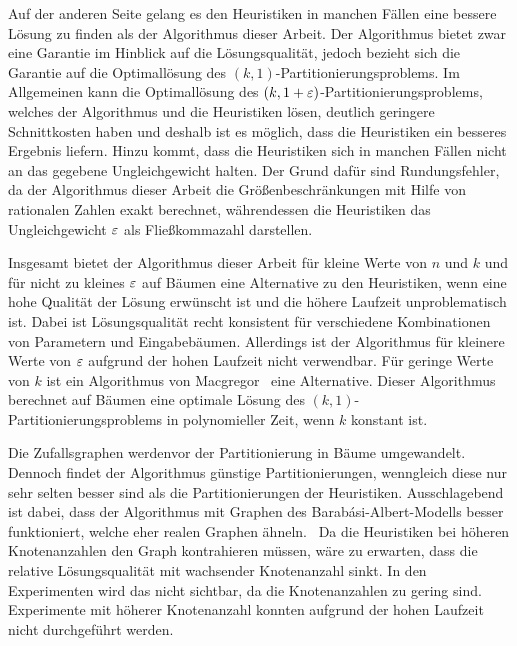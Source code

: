Auf der anderen Seite gelang es den Heuristiken in manchen Fällen eine bessere Lösung zu finden als der Algorithmus dieser Arbeit.
Der Algorithmus bietet zwar eine Garantie im Hinblick auf die Lösungsqualität, jedoch bezieht sich die Garantie auf die Optimallösung des $(k,1)$\hyp Partitionierungsproblems.
Im Allgemeinen kann die Optimallösung des $(k, 1+\varepsilon)$\hyp Partitionierungsproblems, welches der Algorithmus und die Heuristiken lösen, deutlich geringere Schnittkosten haben und deshalb ist es möglich, dass die Heuristiken ein besseres Ergebnis liefern.
Hinzu kommt, dass die Heuristiken sich in manchen Fällen nicht an das gegebene Ungleichgewicht halten.
Der Grund dafür sind Rundungsfehler, da der Algorithmus dieser Arbeit die Größenbeschränkungen mit Hilfe von rationalen Zahlen exakt berechnet, währendessen die Heuristiken das Ungleichgewicht $\varepsilon$ als Fließkommazahl darstellen.

Insgesamt bietet der Algorithmus dieser Arbeit für kleine Werte von $n$ und $k$ und für nicht zu kleines $\varepsilon$ auf Bäumen eine Alternative zu den Heuristiken, wenn eine hohe Qualität der Lösung erwünscht ist und die höhere Laufzeit unproblematisch ist.
Dabei ist Lösungsqualität recht konsistent für verschiedene Kombinationen von Parametern und Eingabebäumen.
Allerdings ist der Algorithmus für kleinere Werte von $\varepsilon$ aufgrund der hohen Laufzeit nicht verwendbar.
Für geringe Werte von $k$ ist ein Algorithmus von Macgregor~\cite{mcg78} eine Alternative.
Dieser Algorithmus berechnet auf Bäumen eine optimale Lösung des $(k,1)$\hyp Partitionierungsproblems in polynomieller Zeit, wenn $k$ konstant ist.

Die Zufallsgraphen werdenvor der Partitionierung in Bäume umgewandelt. 
Dennoch findet der Algorithmus günstige Partitionierungen, wenngleich diese nur sehr selten besser sind als die Partitionierungen der Heuristiken.
Ausschlagebend ist dabei, dass der Algorithmus mit Graphen des Barabási-Albert-Modells besser funktioniert, welche eher realen Graphen ähneln.~\cite{AB02}
Da die Heuristiken bei höheren Knotenanzahlen den Graph kontrahieren müssen, wäre zu erwarten, dass die relative Lösungsqualität mit wachsender Knotenanzahl sinkt.
In den Experimenten wird das nicht sichtbar, da die Knotenanzahlen zu gering sind.
Experimente mit höherer Knotenanzahl konnten aufgrund der hohen Laufzeit nicht durchgeführt werden.

